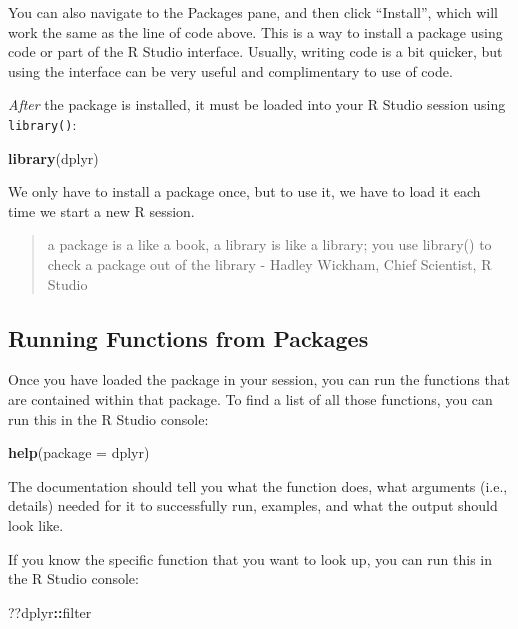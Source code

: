 \documentclass[]{book}
\newenvironment{Shaded}{\begin{snugshade}}{\end{snugshade}}
\newcommand{\KeywordTok}[1]{\textcolor[rgb]{0.13,0.29,0.53}{\textbf{#1}}}
\newcommand{\DataTypeTok}[1]{\textcolor[rgb]{0.13,0.29,0.53}{#1}}
\newcommand{\OperatorTok}[1]{\textcolor[rgb]{0.81,0.36,0.00}{\textbf{#1}}}
\newcommand{\NormalTok}[1]{#1}
\begin{document}
You can also navigate to the Packages pane, and then click ``Install'',
which will work the same as the line of code above. This is a way to
install a package using code or part of the R Studio interface. Usually,
writing code is a bit quicker, but using the interface can be very
useful and complimentary to use of code.

\emph{After} the package is installed, it must be loaded into your R
Studio session using \texttt{library()}:

\begin{Shaded}
\begin{Highlighting}[]
\KeywordTok{library}\NormalTok{(dplyr)}
\end{Highlighting}
\end{Shaded}

We only have to install a package once, but to use it, we have to load
it each time we start a new R session.

\begin{quote}
a package is a like a book, a library is like a library; you use
library() to check a package out of the library - Hadley Wickham, Chief
Scientist, R Studio
\end{quote}

\subsection{Running Functions from
Packages}\label{running-functions-from-packages}

Once you have loaded the package in your session, you can run the
functions that are contained within that package. To find a list of all
those functions, you can run this in the R Studio console:

\begin{Shaded}
\begin{Highlighting}[]
\KeywordTok{help}\NormalTok{(}\DataTypeTok{package =}\NormalTok{ dplyr)}
\end{Highlighting}
\end{Shaded}

The documentation should tell you what the function does, what arguments
(i.e., details) needed for it to successfully run, examples, and what
the output should look like.

If you know the specific function that you want to look up, you can run
this in the R Studio console:

\begin{Shaded}
\begin{Highlighting}[]
\NormalTok{??dplyr}\OperatorTok{::}\NormalTok{filter}
\end{Highlighting}
\end{Shaded}
\end{document}
